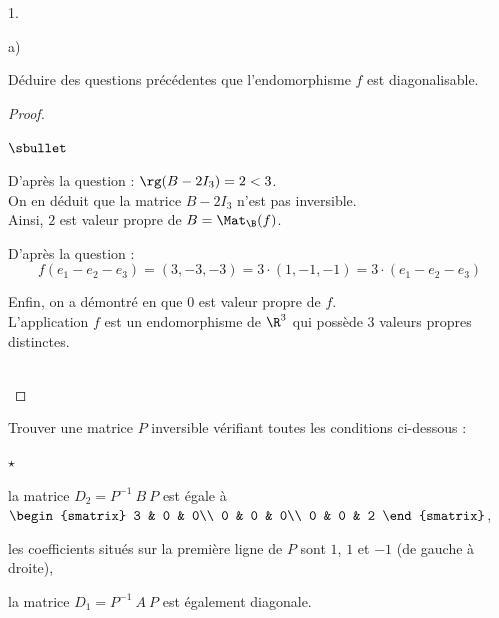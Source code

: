 \documentclass[11pt]{article}%
\begin{document}
\begin{noliste}{1.}
\begin{noliste}{a)}
  \item Déduire des questions précédentes que l'endomorphisme $f$ est
    diagonalisable.

    \begin{proof}~%
      \begin{noliste}{$\sbullet$}
      \item D'après la question  : $\rg(B - 2I_3) = 2 <
        3$.\\
        On en déduit que la matrice $B - 2 I_3$ n'est pas
        inversible.\\
        Ainsi, $2$ est valeur propre de $B = \Mat_{\B}(f)$.%

      \item D'après la question  :
        \[
        f(e_1 - e_2 - e_3) = (3, -3, -3) = 3 \cdot (1, -1, -1) = 3
        \cdot (e_1 - e_2 - e_3)
        \]




      \item Enfin, on a démontré en  que $0$ est valeur
        propre de $f$.\\
        L'application $f$ est un endomorphisme de $\R^3$ qui possède
        $3$ valeurs propres distinctes.%
      \end{noliste}
        ~\\[-1.4cm]
    \end{proof}
  \end{noliste}
  
\item Trouver une matrice $P$ inversible vérifiant toutes les
  conditions ci-dessous :
  \begin{noliste}{$\star$}
  \item la matrice $D_{2} = P^{-1} \ B \ P$ est égale à
    $\begin{smatrix}
      3 & 0 & 0\\
      0 & 0 & 0\\
      0 & 0 & 2
    \end{smatrix}
    $,
  \item les coefficients situés sur la première ligne de $P$ sont $1$,
    $1$ et $-1$ (de gauche à droite),
  \item la matrice $D_{1} = P^{-1}\ A \ P$ est également diagonale.
  \end{noliste}


\end{noliste}
\end{document}
